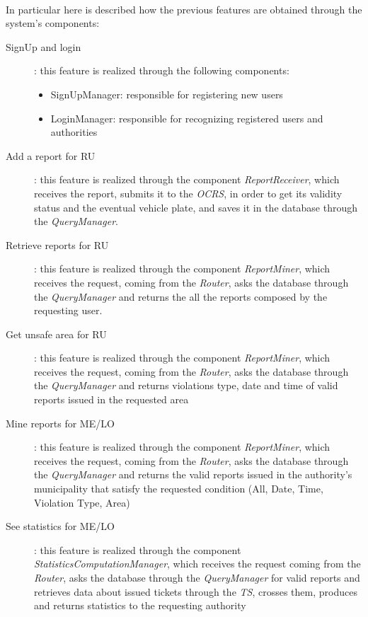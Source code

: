 		\paragraph{}
			In particular here is described how the previous features are obtained through the system's components:
			\begin{description}
				\item [SignUp and login]: this feature is realized through the following components:
					\begin{itemize}
						\item SignUpManager: responsible for registering new users
						\item LoginManager: responsible for recognizing registered users and authorities
					\end{itemize}
				\item [Add a report for RU]: this feature is realized through the component \textit{ReportReceiver}, which receives the report, submits it to the \textit{OCRS}, in order to get its validity status and the eventual vehicle plate, and saves it in the database through the \textit{QueryManager}.
				\item [Retrieve reports for RU]: this feature is realized through the component \textit{ReportMiner}, which receives the request, coming from the \textit{Router}, asks the database through the \textit{QueryManager} and returns the all the reports composed by the requesting user.
				\item [Get unsafe area for RU]: this feature is realized through the component \textit{ReportMiner}, which receives the request, coming from the \textit{Router}, asks the database through the \textit{QueryManager} and returns violations type, date and time of valid reports issued in the requested area
				\item [Mine reports for ME/LO]: this feature is realized through the component \textit{ReportMiner}, which receives the request, coming from the \textit{Router}, asks the database through the \textit{QueryManager} and returns the valid reports issued in the authority's municipality that satisfy the requested condition (All, Date, Time, Violation Type, Area)
				\item [See statistics for ME/LO]: this feature is realized through the component \textit{StatisticsComputationManager}, which receives the request coming from the \textit{Router}, asks the database through the \textit{QueryManager} for valid reports and retrieves data about issued tickets through the \textit{TS}, crosses them, produces and returns statistics to the requesting authority

\end{description}
